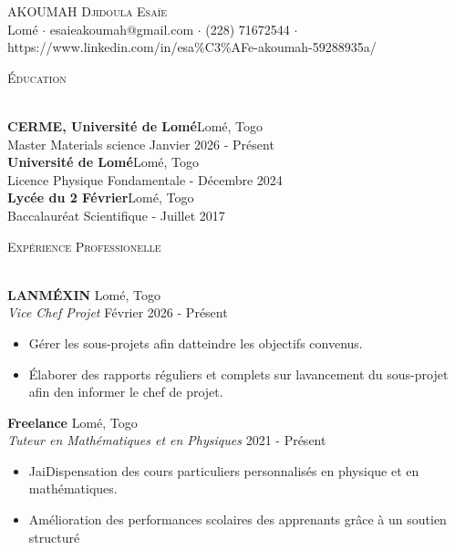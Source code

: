 \documentclass[a4paper]{article}
\newcommand{\lineunder} {
    \vspace*{-8pt} \\
    \hspace*{-18pt} \hrulefill \\
}
\newcommand{\header} [1] {
    {\hspace*{-18pt}\vspace*{6pt} \textsc{#1}}
    \vspace*{-6pt} \lineunder
}
\begin{document}
\vspace*{-40pt}

    

\vspace*{-10pt}
\begin{center}
	{\Huge \scshape {AKOUMAH Djidoula Esaïe}}\\
	Lomé $\cdot$ esaieakoumah@gmail.com $\cdot$ (228) 71672544 $\cdot$ https://www.linkedin.com/in/esa\%C3\%AFe-akoumah-59288935a/\\
\end{center}
\vspace{0,5cm}

\header{Éducation}
\vspace{5mm}

\textbf{CERME, Université de Lomé}\hfill Lomé, Togo\\
Master Materials science \hfill Janvier 2026 - Présent\\
\vspace{2mm}
\textbf{Université de Lomé}\hfill Lomé, Togo\\
Licence Physique Fondamentale \hfill  - Décembre 2024\\
\vspace{2mm}
\textbf{Lycée du 2 Février}\hfill Lomé, Togo\\
Baccalauréat Scientifique \hfill  - Juillet 2017\\
\vspace{0,5cm}

\header{Expérience Professionelle}
\vspace{5mm}

\textbf{LAN\textquotesingle{}MÉXIN} \hfill Lomé, Togo\\
\textit{Vice Chef Projet} \hfill Février 2026 - Présent\\
\vspace{-1mm}
\begin{itemize} \itemsep 1pt
	\item Gérer les sous-projets afin d\textquotesingle{}atteindre les objectifs convenus.
	\item Élaborer des rapports réguliers et complets sur l\textquotesingle{}avancement du sous-projet afin d\textquotesingle{}en informer le chef de projet.
\end{itemize}
\textbf{Freelance} \hfill Lomé, Togo\\
\textit{Tuteur en Mathématiques et en Physiques} \hfill 2021 - Présent\\
\vspace{-1mm}
\begin{itemize} \itemsep 1pt
	\item J\textquotesingle{}aiDispensation des cours particuliers personnalisés en physique et en mathématiques.
	\item Amélioration des performances scolaires des apprenants grâce à un soutien structuré
\end{itemize}
\vspace{0,5cm}
\end{document}
